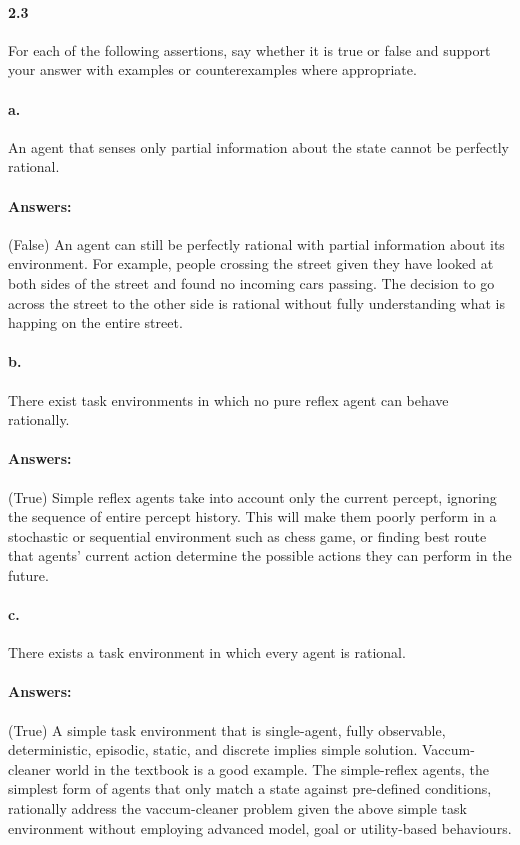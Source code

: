 \documentclass[a4paper]{article}
\begin{document}
\paragraph{2.3}
For each of the following assertions, say whether it is true or false and support your answer with examples or counterexamples where appropriate.

\paragraph{a.} An agent that senses only partial information about the state cannot be perfectly rational.

\paragraph{Answers:}
(False) An agent can still be perfectly rational with partial information about its environment. 
For example, people crossing the street given they have looked at both sides of the street and found 
no incoming cars passing. The decision to go across the street to the other side is rational without fully 
understanding what is happing on the entire street.

\paragraph{b.} There exist task environments in which no pure reflex agent can behave rationally.

\paragraph{Answers:}
(True) Simple reflex agents take into account only the current percept, ignoring the sequence of entire percept 
history. This will make them poorly perform in a stochastic or sequential environment such as chess game, 
or finding best route that agents' current action determine the possible actions they can perform in the future.

\paragraph{c.} There exists a task environment in which every agent is rational.

\paragraph{Answers:}
(True) A simple task environment that is single-agent, fully observable, deterministic, episodic, static, 
and discrete implies simple solution. Vaccum-cleaner world in the textbook is a good example. 
The simple-reflex agents, the simplest form of agents that only match a state against pre-defined 
conditions, rationally address the vaccum-cleaner problem given the above simple task environment without 
employing advanced model, goal or utility-based behaviours.
\end{document}
